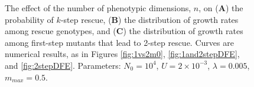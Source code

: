 \documentclass[9pt,twocolumn,twoside,lineno]{gsajnl}
\begin{document}
\begin{figure}[htbp]
\caption{
The effect of the number of phenotypic dimensions, $n$, on (\textbf{A}) the probability of $k$-step rescue, (\textbf{B}) the distribution of growth rates among rescue genotypes, and (\textbf{C}) the distribution of growth rates among first-step mutants that lead to 2-step rescue.
Curves are numerical results, as in Figures \ref{fig:1vs2m0}, \ref{fig:1and2stepDFE}, and \ref{fig:2stepDFE}.
Parameters: $N_0=10^4$, $U=2\times 10^{-3}$, $\lambda=0.005$, $m_{max}=0.5$.
}%
\label{fig:dimension}
\end{figure}
\end{document}
